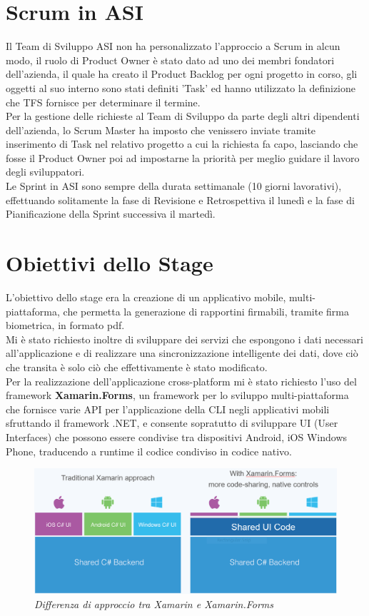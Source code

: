 \section{Scrum in ASI}
Il Team di Sviluppo ASI non ha personalizzato l'approccio a Scrum in alcun modo, il ruolo di Product Owner è stato dato ad uno dei membri fondatori dell'azienda, il quale ha creato il Product Backlog per ogni progetto in corso, gli oggetti al suo interno sono stati definiti 'Task' ed hanno utilizzato la definizione che TFS fornisce per determinare il termine.
\\
Per la gestione delle richieste al Team di Sviluppo da parte degli altri dipendenti dell'azienda, lo Scrum Master ha imposto che venissero inviate tramite inserimento di Task nel relativo progetto a cui la richiesta fa capo, lasciando che fosse il Product Owner poi ad impostarne la priorità per meglio guidare il lavoro degli sviluppatori.
\\
Le Sprint in ASI sono sempre della durata settimanale (10 giorni lavorativi), effettuando solitamente la fase di Revisione e Retrospettiva il lunedì e la fase di Pianificazione della Sprint successiva il martedì.

\section{Obiettivi dello Stage}
L'obiettivo dello stage era la creazione di un applicativo mobile, multi-piattaforma, che permetta la generazione di rapportini firmabili, tramite firma biometrica, in formato pdf.
\\
Mi è stato richiesto inoltre di sviluppare dei servizi che espongono i dati necessari all'applicazione e di realizzare una sincronizzazione intelligente dei dati, dove ciò che transita è solo ciò che effettivamente è stato modificato. 
\\
Per la realizzazione dell'applicazione cross-platform mi è stato richiesto l'uso del framework \textbf{Xamarin.Forms}, un framework per lo sviluppo multi-piattaforma che fornisce varie API per l'applicazione della CLI negli applicativi mobili sfruttando il framework .NET, e consente sopratutto di sviluppare UI (User Interfaces) che possono essere condivise tra dispositivi Android, iOS Windows Phone, traducendo a runtime il codice condiviso in codice nativo.

\begin{figure}[ht]
	\centering
	\includegraphics[scale=0.57]{immagini/processo/xamarinForms.png}
	\caption{\textit{Differenza di approccio tra Xamarin e Xamarin.Forms}}
\end{figure}\FloatBarrier

